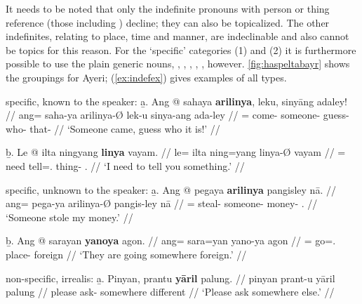 It needs to be noted that only the 
indefinite pronouns with person or thing reference (those including 
) decline; they can also be topicalized. The other indefinites, 
relating to place, time and manner, are indeclinable and also cannot be topics 
for this reason.
%
%
For the `specific' categories (1) and (2) it is furthermore possible to use the
plain generic nouns, , ,
, , , 
however. \autoref{fig:haspeltabayr} shows the groupings for Ayeri; 
(\ref{ex:indefex}) gives examples of all types.

\pex[labeltype=numeric,interpartskip=1em]\label{ex:indefex}
\a specific, known to the speaker:\vspace{.5em} %
	\beginsubsub
	\b{a.} \begingl
		\gla Ang @ sahaya \textbf{arilinya}, leku, sinyāng adaley! //
		\glb ang= saha-ya arilinya-Ø lek-u sinya-ang ada-ley //
		\glc \AgtT{}= come-\TsgM{} someone-\Top{} guess-\Imp{} 
			who-\Aarg{} that-\PargI{} //
		\glft `Someone came, guess who it is!' //
		\endgl\vspace{.5em}
		
	\b{b.} \begingl
		\gla Le @ ilta ningyang \textbf{linya} vayam. //
		\glb le= ilta ning=yang linya-Ø vayam //
		\glc \PatTI{}= need tell=\Fsg{}.\Aarg{} thing-\Top{} 
			\Second{}.\Dat{} //
		\glft `I need to tell you something.' //
		\endgl
	\endsubsub

\a specific, unknown to the speaker:\vspace{.5em} %
	\beginsubsub
	\b{a.} \begingl
		\gla Ang @ pegaya \textbf{arilinya} pangisley nā. //
		\glb ang= pega-ya arilinya-Ø pangis-ley nā //
		\glc \AgtT{}= steal-\TsgM{} someone-\Top{} money-\PargI{} 
			\Fsg{}.\Gen{} //
		\glft `Someone stole my money.' //
		\endgl\vspace{.5em}
		
	\b{b.} \begingl
		\gla Ang @ sarayan \textbf{yanoya} agon. //
		\glb ang= sara=yan yano-ya agon //
		\glc \AgtT{}= go=\TplM{}.\Top{} place-\Loc{} foreign //
		\glft `They are going somewhere foreign.' //
		\endgl
	\endsubsub

\a non-specific, irrealis:\vspace{.5em} %
	\beginsubsub
	\b{a.} \begingl
		\gla Pinyan, prantu \textbf{yāril} palung. //
		\glb pinyan prant-u yāril palung //
		\glc please ask-\Imp{} somewhere different //
		\glft `Please ask somewhere else.' //
		\endgl\vspace{.5em}
		
